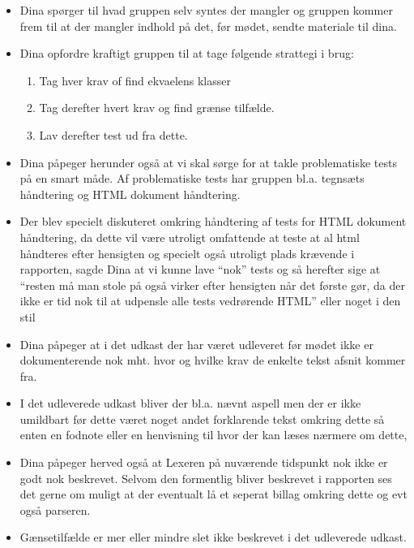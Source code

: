 \begin{itemize}

\item Dina spørger til hvad gruppen selv syntes der mangler og gruppen kommer frem til at der mangler indhold på det, før mødet, sendte materiale til dina.

\item Dina opfordre kraftigt gruppen til at tage følgende strattegi i brug:

\begin{enumerate}
\item Tag hver krav of find ekvaelens klasser
\item Tag derefter hvert krav og find grænse tilfælde.
\item Lav derefter test ud fra dette.
\end{enumerate}

\item Dina påpeger herunder også at vi skal sørge for at takle problematiske tests på en smart måde. Af problematiske tests har gruppen bl.a. tegnsæts håndtering og HTML dokument håndtering.

\item Der blev specielt diskuteret omkring håndtering af tests for HTML dokument håndtering, da dette vil være utroligt omfattende at teste at al html håndteres efter hensigten og specielt også utroligt plads krævende i rapporten, sagde Dina at vi kunne lave ``nok'' tests og så herefter sige at ``resten må man stole på også virker efter hensigten når det første gør, da der ikke er tid nok til at udpensle alle tests vedrørende HTML'' eller noget i den stil

\item Dina påpeger at i det udkast der har været udleveret før mødet ikke er dokumenterende nok mht. hvor og hvilke krav de enkelte tekst afsnit kommer fra.

\item I det udleverede udkast bliver der bl.a. nævnt aspell men der er ikke umildbart før dette været noget andet forklarende tekst omkring dette så enten en fodnote eller en henvisning til hvor der kan læses nærmere om dette,

\item Dina påpeger herved også at Lexeren på nuværende tidspunkt nok ikke er godt nok beskrevet. Selvom den formentlig bliver beskrevet i rapporten ses det gerne om muligt at der eventualt lå et seperat billag omkring dette og evt også parseren.

\item Gænsetilfælde er mer eller mindre slet ikke beskrevet i det udleverede udkast.


\end{itemize}
